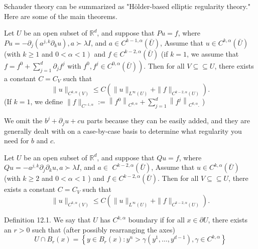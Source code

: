 Schauder theory can be summarized as "H\"older-based elliptic regularity theory." Here are some of the main theorems.


\begin{theorem}
\label{thm: Schauder, interior regularity, divergence form}
 Let $U$ be an open subset of $\mathbb{R}^{d}$, and suppose that $P u=f$, where $P u=-\partial_{j}\left(a^{j, k} \partial_{k} u\right), a \succ \lambda I$, and $a \in C^{k-1, \alpha}(\bar{U})$, Assume that $u \in C^{k, \alpha}(\bar{U})$ (with $k \geq 1$ and $\left.0<\alpha<1\right)$ and $f \in C^{k-2, \alpha}(\bar{U})$ (if $k=1$, we assume that $f=f^{0}+\sum_{j=1}^{d} \partial_{j} f^{j}$ with $\left.f^{0}, f^{j} \in C^{0, \alpha}(\bar{U})\right)$. Then for all $V \subseteq \subseteq U$, there exists a constant $C=C_{V}$ such that
$$
\|u\|_{C^{k, \alpha}(V)} \leq C\left(\|u\|_{L^\infty(U)}+\|f\|_{C^{k-2, \alpha}(U)}\right) .
$$
(If $k=1$, we define $\|f\|_{C^{-1, \alpha}}:=\left\|f^{0}\right\|_{C^{0, \alpha}}+\sum_{j=1}^{d}\left\|f^{j}\right\|_{C^{0, \alpha} .}$ )
\end{theorem}

\begin{remark}
We omit the $b^{j}+\partial_{j} u+c u$ parts because they can be easily added, and they are generally dealt with on a case-by-case basis to determine what regularity you need for $b$ and $c$.
\end{remark}


\begin{theorem}
\label{thm: Schauder, interior regularity, non-divergence form}
Let $U$ be an open subset of $\mathbb{R}^{d}$, and suppose that $Q u=f$, where $Q u=-a^{j, k} \partial_{j} \partial_{k} u, a \succ \lambda I$, and $a \in$ $C^{k-2, \alpha}(\bar{U})$, Assume that $u \in C^{k, \alpha}(\bar{U})$ (with $k \geq 2$ and $0<\alpha<1$ ) and $f \in C^{k-2, \alpha}(\bar{U})$. Then for all $V \subseteq \subseteq U$, there exists a constant $C=C_{V}$ such that
$$
\|u\|_{C^{k, \alpha}(V)} \leq C\left(\|u\|_{L^\infty(U)}+\|f\|_{C^{k-2, \alpha}(U)}\right) .
$$
\end{theorem}


\begin{definition}
\label{def: C^{k,alpha} boundary}
Definition 12.1. We say that $U$ has $C^{k, \alpha}$ boundary if for all $x \in \partial U$, there exists an $r>0$ such that (after possibly rearranging the axes)
$$
U \cap B_{r}(x)=\left\{y \in B_{r}(x): y^{n}>\gamma\left(y^{1}, \ldots, y^{d-1}\right), \gamma \in C^{k, \alpha}\right\}
$$
\end{definition}


